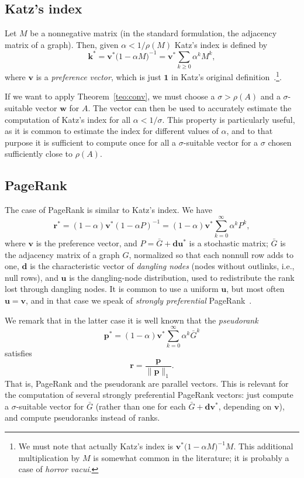 \documentclass{article}
\newcommand{\w}{{\bm w}}
\newcommand{\1}{\mathbf 1}
\begin{document}
\subsection{Katz's index}

Let $M$ be a nonnegative matrix (in the standard formulation, the adjacency
matrix of a graph). Then, given $\alpha<1/\rho(M)$ Katz's index is defined by
\[
\bm k^*= \bm v^*\bigl(1-\alpha M\bigr)^{-1}= \bm v^*\sum_{k\geq
0}\alpha^kM^k,
\]
where $\bm v$ is a \emph{preference vector}, which is just $\mathbf 1$ in Katz's
original definition~\cite{KatNSIDSA}.\footnote{We must note that actually Katz's index is 
$\bm v^*\bigl(1-\alpha M\bigr)^{-1}M$. This additional multiplication by
$M$ is somewhat common in the literature; it is probably a case of
\textit{horror vacui}.}.

If we want to apply Theorem~\ref{teo:conv}, we must choose a $\sigma>\rho(A)$
and a $\sigma$-suitable vector $\w$ for $A$. The vector can then be used to
accurately estimate the computation of Katz's index for all
$\alpha<1/\sigma$. This property is particularly useful, as it is common to
estimate the index for different values of $\alpha$, and to that purpose it is
sufficient to compute once for all a $\sigma$-suitable vector for  
a $\sigma$ chosen sufficiently close to $\rho(A)$.

\subsection{PageRank} The case of PageRank is similar to Katz's index. We have
\[ \bm r^*= (1-\alpha)\bm v^*(1-\alpha P)^{-1}= (1-\alpha)\bm
v^*\sum_{k=0}^\infty\alpha^kP^k, \] where $\bm v$ is the preference vector, and
$P=\bar G+\bm d\bm u^*$ is a stochastic matrix; $\bar G$ is the adjacency matrix
of a graph $G$, normalized so that each nonnull row adds to one, $\bm d$ is the
characteristic vector of \emph{dangling nodes} (nodes without outlinks, i.e.,
null rows), and $\bm u$ is the dangling-node distribution, used to redistribute
the rank lost through dangling nodes. It is common to use a uniform $\bm u$, but
most often $\bm u=\bm v$, and in that case we speak of \emph{strongly
preferential} PageRank~\cite{BSVPFD}.

We remark that in the latter case it is well known that the \emph{pseudorank}
\[
\bm p^*= (1-\alpha)\bm v^*\sum_{k=0}^\infty\alpha^k\bar G^k 
\]
satisfies
\[
\bm r = \frac{\bm p}{\|\bm p\|_1}.
\]
That is, PageRank and the pseudorank are parallel vectors. This is relevant for
the computation of several strongly preferential PageRank vectors: just
compute a $\sigma$-suitable vector for $\bar G$ (rather than
one for each $\bar G+\bm d\bm v^*$, depending on $\bm v$), and compute
pseudoranks instead of ranks.
\end{document}
